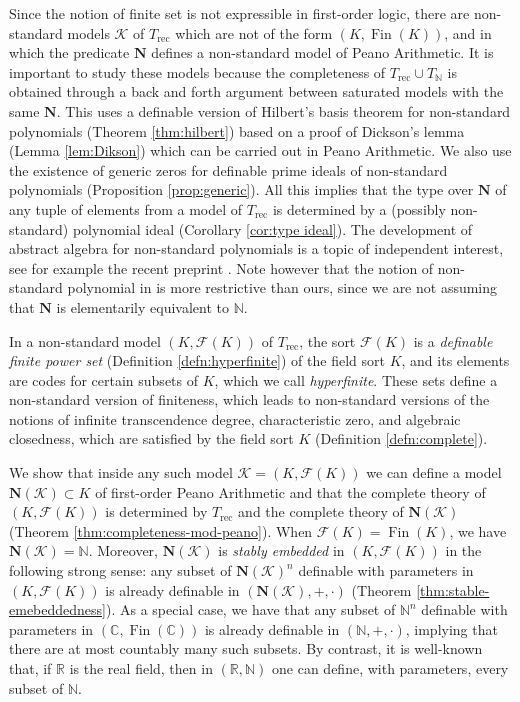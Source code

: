 \documentclass{amsart}
\newcommand{\R}{\mathbb R}
\newcommand{\C}{\mathbb C}
\newcommand{\N}{\mathbb N}
\newcommand{\Fin}{\operatorname{Fin}}
\theoremstyle{plain}
\theoremstyle{definition}
\newcommand{\F}{\mathcal{F}}
\newcommand{\hn}{\mathbf N}
\begin{document}
Since the notion of finite set is not expressible in first-order logic, there are non-standard models $\mathcal K$ of $T_{\text{rec}}$ which are not of the form $(K, \Fin(K))$, and in which the predicate $\hn$ defines a non-standard model of Peano Arithmetic. It is important to study these models because the completeness of $T_{\text{rec}} \cup T_\N$ is obtained through a back and forth argument between saturated models with the same $\hn$. This uses a definable version of Hilbert's basis theorem for non-standard polynomials (Theorem \ref{thm:hilbert}) based on a proof of Dickson's lemma (Lemma \ref{lem:Dikson}) which can be carried out in Peano Arithmetic. We also use the existence of generic zeros for definable prime ideals of non-standard polynomials (Proposition \ref{prop:generic}). All this implies that the type over $\hn$ of any tuple of elements from a model of $T_{\text{rec}}$ is determined by a (possibly non-standard) polynomial ideal (Corollary \ref{cor:type ideal}). The development of abstract algebra for non-standard polynomials is a topic of independent interest, see for example the recent preprint \cite{MN}. Note however that the notion of non-standard polynomial in \cite{MN} is more restrictive than ours, since we are not assuming that $\hn$ is elementarily equivalent to $\N$. 

In a non-standard model $(K,\mathcal{F}(K))$ of $T_{\text{rec}}$, the sort $\mathcal{F}(K)$ is a \emph{definable finite power set} (Definition \ref{defn:hyperfinite}) of the field sort $K$, and its elements are codes for certain subsets of $K$, which we call \emph{hyperfinite}. These sets define a non-standard version of finiteness, which leads to non-standard versions of the notions of infinite transcendence degree, characteristic zero, and algebraic closedness, which are satisfied by the field sort $K$ (Definition \ref{defn:complete}).

We show that inside any such model $\mathcal K = (K, \F(K))$ we can define a model $\hn(\mathcal K) \subset K$ of first-order Peano Arithmetic and that the complete theory of $(K, \F(K))$ is determined by $T_{\text{rec}}$ and the complete theory of $\hn(\mathcal K)$
(Theorem \ref{thm:completeness-mod-peano}). When $\F(K) = \Fin(K)$, we have $\hn(\mathcal K) = \N$. Moreover, $\hn(\mathcal{K})$ is {\em stably embedded} in $(K, \mathcal{F}(K))$ in the following strong sense: any subset of $\hn(\mathcal{K})^n$ definable with parameters in $(K, \mathcal{F}(K))$ is already definable in $(\hn(\mathcal{K}), +, \cdot)$ (Theorem \ref{thm:stable-emebeddedness}). As a special case, we have that any subset of $\N^n$ definable with parameters in $(\C, \Fin(\C))$ is already definable in $(\N, +, \cdot)$, implying that there are at most countably many such subsets. By contrast, it is well-known that, if $\R$ is the real field, then in $(\R, \N)$ one can define, with parameters, every subset of $\N$. 
\end{document}
